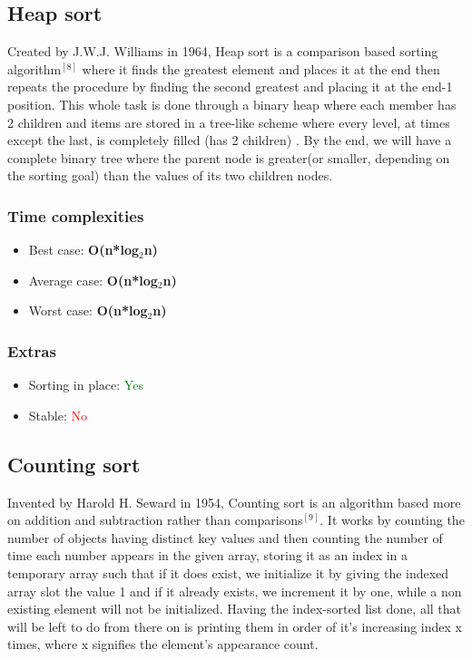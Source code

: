 \documentclass{article}
\begin{document}
\begin{multicols}{2}
\bigbreak \bigbreak \bigbreak \bigbreak \bigbreak \bigbreak \bigbreak \bigbreak \bigbreak \bigbreak \bigbreak \bigbreak \bigbreak \bigbreak \bigbreak \bigbreak \bigbreak \bigbreak \bigbreak \bigbreak


\subsection{Heap sort}
Created by J.W.J. Williams in 1964, Heap sort is a comparison based sorting algorithm$^{[8]}$ where it  finds the greatest element and places it at the end then repeats the procedure by finding the second greatest and placing it at the end-1 position. This whole task is done through a binary heap where each member has 2 children and items are stored in a tree-like scheme where every level, at times except the last, is completely filled (has 2 children) . By the end, we will have a complete binary tree where the parent node is greater(or smaller, depending on the sorting goal) than the values of its two children nodes.
\subsubsection{Time complexities}
\begin{itemize}
    \item Best case: \textbf{O(n*log$_2$n)}
    \item Average case: \textbf{O(n*log$_2$n)}
    \item Worst case: \textbf{O(n*log$_2$n)}
\end{itemize}

\subsubsection{Extras}
\begin{itemize}
    \item Sorting in place: \textcolor{green}{Yes}
    \item Stable: \textcolor{red}{No}
\end{itemize}

\bigbreak \bigbreak \bigbreak \bigbreak \bigbreak \bigbreak \bigbreak \bigbreak \bigbreak \bigbreak \bigbreak \bigbreak \bigbreak \bigbreak \bigbreak \bigbreak \bigbreak \bigbreak \bigbreak \bigbreak



\subsection{Counting sort}
Invented by Harold H. Seward in 1954, Counting sort is an algorithm based more on addition and subtraction rather than comparisons$^{[9]}$. It works by counting the number of objects having distinct key values and then counting the number of time each number appears in the given array, storing it as an index in a temporary array such that if it does exist, we initialize it by giving the indexed array slot the value 1 and if it already exists, we increment it by one, while a non existing element will not be initialized. Having the index-sorted list done, all that will be left to do  from there on is printing them in order of it's increasing index x times, where x signifies the element's appearance count. 

\end{multicols}
\end{document}
